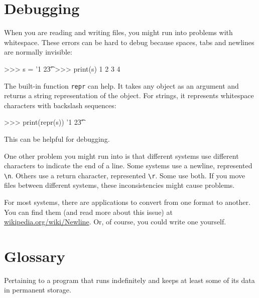 \section{Debugging}


When you are reading and writing files, you might run into problems
with whitespace.  These errors can be hard to debug because spaces,
tabs and newlines are normally invisible:

\beforeverb
\begin{pyinterpreter}
>>> s = '1 2\t 3'
>>> print(s)
1 2	 3
 4
\end{pyinterpreter}
\afterverb


The built-in function {\tt repr} can help.  It takes any object as an
argument and returns a string representation of the object.  For
strings, it represents whitespace
characters with backslash sequences:

\beforeverb
\begin{pyinterpreter}
>>> print(repr(s))
'1 2\t 3'
\end{pyinterpreter}
\afterverb

This can be helpful for debugging.

One other problem you might run into is that different systems
use different characters to indicate the end of a line.  Some
systems use a newline, represented \verb"\n".  Others use
a return character, represented \verb"\r".  Some use both.
If you move files between different systems, these inconsistencies
might cause problems.


For most systems, there are applications to convert from one
format to another.  You can find them (and read more about this
issue) at \url{wikipedia.org/wiki/Newline}.  Or, of course, you
could write one yourself.


\section{Glossary}
	
\begin{vocabulary}[persistent:] Pertaining to a program that runs indefinitely
and keeps at least some of its data in permanent storage.
\end{vocabulary}
	
